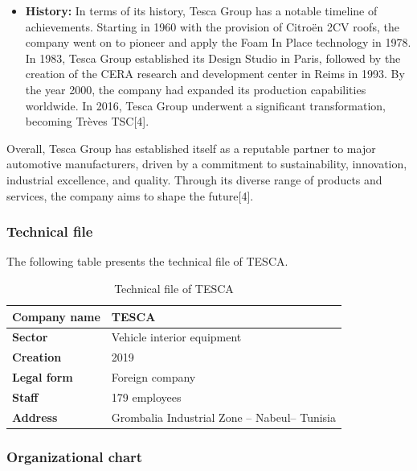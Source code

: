 \begin{itemize}

    \item \textbf{History:} In terms of its history, Tesca Group has a notable timeline of achievements. Starting in 1960 with the provision of Citro\"en 2CV roofs, the company went on to pioneer and apply the Foam In Place technology in 1978. In 1983, Tesca Group established its Design Studio in Paris, followed by the creation of the CERA research and development center in Reims in 1993. By the year 2000, the company had expanded its production capabilities worldwide. In 2016, Tesca Group underwent a significant transformation, becoming Tr\`eves TSC[4].

\end{itemize}

Overall, Tesca Group has established itself as a reputable partner to major automotive manufacturers,
driven by a commitment to sustainability, innovation, industrial excellence, and quality. Through its
diverse range of products and services, the company aims to shape the future[4].

\subsubsection{Technical file}

The following table presents the technical file of TESCA.

\begin{table}[H]
    \centering
    \caption{Technical file of TESCA}
    \begin{tabular}{|l|l|}
        \hline
        \textbf{Company name} & \textbf{TESCA} \\
        \hline
        \textbf{Sector} & Vehicle interior equipment \\
        \hline
        \textbf{Creation} & 2019 \\
        \hline
        \textbf{Legal form} & Foreign company \\
        \hline
        \textbf{Staff} & 179 employees \\
        \hline
        \textbf{Address} & Grombalia Industrial Zone – Nabeul– Tunisia \\
        \hline
    \end{tabular}
\end{table}

\subsubsection{Organizational chart}

